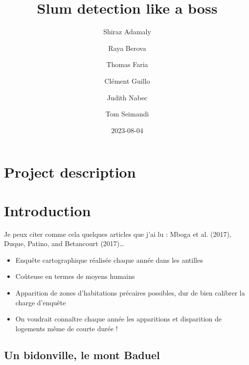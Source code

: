 \documentclass[
  letterpaper,
  DIV=11,
  numbers=noendperiod]{scrreprt}
\title{Slum detection like a boss}
\author{Shiraz Adamaly \and Raya Berova \and Thomas Faria \and Clément
Guillo \and Judith Nabec \and Tom Seimandi}
\date{2023-08-04}
\providecommand{\tightlist}{%
  \setlength{\itemsep}{0pt}\setlength{\parskip}{0pt}}\usepackage{longtable,booktabs,array}
\renewcommand*\contentsname{Table of contents}
\newcommand\contentsname{Table of contents}
\begin{document}
\maketitle
\ifdefined\Shaded\renewenvironment{Shaded}{\begin{tcolorbox}[interior hidden, boxrule=0pt, sharp corners, enhanced, frame hidden, borderline west={3pt}{0pt}{shadecolor}, breakable]}{\end{tcolorbox}}\fi

\renewcommand*\contentsname{Contents}
{
\hypersetup{linkcolor=}
\setcounter{tocdepth}{2}
\tableofcontents
}

\hypertarget{project-description}{%
\chapter*{Project description}\label{project-description}}



\hypertarget{introduction}{%
\chapter{Introduction}\label{introduction}}

Je peux citer comme cela quelques articles que j'ai lu : Mboga et al.
(2017), Duque, Patino, and Betancourt (2017)\ldots{}

\begin{itemize}
\tightlist
\item
  Enquête cartographique réalisée chaque année dans les antilles
\item
  Coûteuse en termes de moyens humains
\item
  Apparition de zones d'habitations précaires possibles, dur de bien
  calibrer la charge d'enquête
\item
  On voudrait connaître chaque année les apparitions et disparition de
  logements même de courte durée !
\end{itemize}

\hypertarget{un-bidonville-le-mont-baduel}{%
\section{Un bidonville, le mont
Baduel}\label{un-bidonville-le-mont-baduel}}
\end{document}
